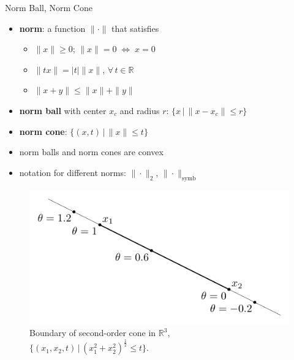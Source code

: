 \documentclass[10pt,handout]{beamer}
\newcommand{\ds}{\displaystyle}
\newcommand{\ifff}{\;\Longleftrightarrow\;}
\theoremstyle{definition}
\begin{document}
\begin{frame}{Norm Ball, Norm Cone}
  \begin{itemize}
    \item {\bf norm}: a function $\|\cdot\|$ that satisfies 
      \begin{itemize}
        \item $\|x\|\geqslant 0$; $\|x\| = 0\ifff x = 0$
        \item $\|tx\| = |t|\|x\|$, $\forall\,t\in\mathbb{R}$
        \item $\|x + y\|\leqslant\|x\| + \|y\|$
      \end{itemize}
    \item {\bf norm ball} with center $x_c$ and radius $r$: $\ds\{x\,|\,\|x - x_c\|\leqslant r\}$
    \item {\bf norm cone}: $\ds\{(x, t)\,|\,\|x\|\leqslant t\}$
    \item norm balls and norm cones are convex
    \item notation for different norms: $\|\cdot\|_2$, $\|\cdot\|_{\text{symb}}$
  \end{itemize}
  \begin{figure}[!htbp]
    \centering
    \includegraphics[scale=0.55,page=10]{fig/note06/02.pdf}
    \caption{Boundary of second-order cone in $\mathbb{R}^3$, $\{(x_1, x_2, t)\,|\,(x_1^2 + x_2^2)^{\frac{1}{2}}\leqslant t\}$. }
  \end{figure}
\end{frame}
\end{document}
